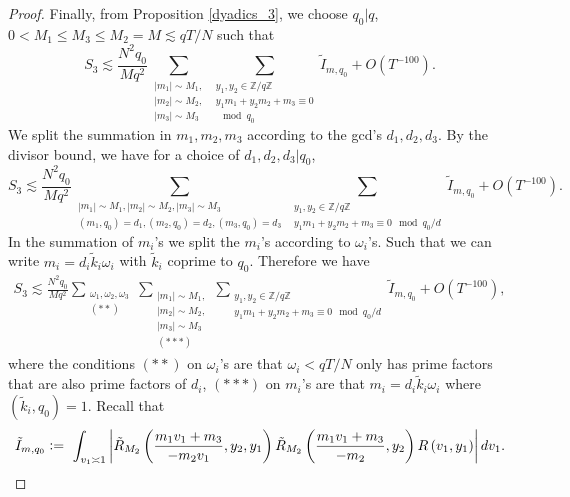 \begin{proof}
    Finally, from Proposition \ref{dyadics_3}, we choose $q_0|q$, $0<M_1\leq M_3\leq M_2=M\lesssim qT/N$ such that
    \[
        S_3\lesssim \frac{N^2q_0}{Mq^2}\sum_{\substack{|m_1|\sim M_1,\\|m_2|\sim M_2,\\|m_3|\sim M_3}}\sum_{\substack{y_1,y_2 \in\mathbb{Z}/q\mathbb{Z} \\ y_1m_1+y_2m_2+m_3\equiv 0\\ \mod q_0}}\tilde{I}_{m,q_0}+O(T^{-100}).
    \]
    We split the summation in $m_1,m_2,m_3$ according to the gcd's $d_1,d_2,d_3$. By the divisor bound, we have for a choice of $d_1,d_2,d_3|q_0$,
     \[
        S_3\lesssim \frac{N^2q_0}{Mq^2}\sum_{\substack{|m_1|\sim M_1,|m_2|\sim M_2,|m_3|\sim M_3\\
        (m_1,q_0)=d_1,(m_2,q_0)=d_2,(m_3,q_0)=d_3}}\sum_{\substack{y_1,y_2 \in\mathbb{Z}/q\mathbb{Z} \\ y_1m_1+y_2m_2+m_3\equiv 0 \mod q_0/d}}\tilde{I}_{m,q_0}+O(T^{-100}).
    \]
    In the summation of $m_i$'s we split the $m_i$'s according to $\omega_i$'s. Such that we can write $m_i=d_i\tilde{k}_i\omega_i$ with $\tilde{k}_i$ coprime to $q_0$.
    Therefore we have \begin{align*}
        S_3\lesssim \frac{N^2q_0}{Mq^2} \sum_{\substack{\omega_1,\omega_2,\omega_3\\ (**)}}  \sum_{\substack{|m_1|\sim M_1,\\|m_2|\sim M_2,\\|m_3|\sim M_3\\
        (***)}}\sum_{\substack{y_1,y_2 \in\mathbb{Z}/q\mathbb{Z} \\ y_1m_1+y_2m_2+m_3\equiv 0 \mod q_0/d}}\tilde{I}_{m,q_0}+O(T^{-100}),
    \end{align*}
    where the conditions $(**)$ on $\omega_i$'s are that $\omega_i<qT/N$ only has prime factors that are also prime factors of $d_i$, $(***)$ on $m_i$'s are that
    $m_i=d_i\tilde{k}_i\omega_i$ where $(\tilde{k}_i,q_0)=1$. 
    Recall that \[
        \tilde{I}_{m,q_0}\defeq \ \int_{v_1\asymp 1} \left| \tilde{R}_{M_2}\left(\frac{m_1v_1+m_3}{-m_2v_1},y_2,y_1\right)
    \tilde{R}_{M_2}\left(\frac{m_1v_1+m_3}{-m_2},y_2\right)R\left(v_1,y_1\right)\right| dv_1.\]


\end{proof}
